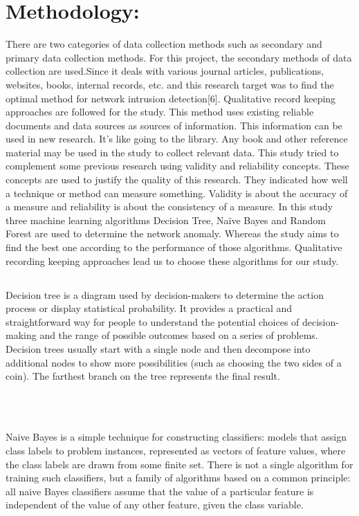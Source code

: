 \documentclass[conference]{IEEEtran}
\begin{document}
\section{Methodology:}

There are two categories of data collection methods such as secondary and primary data collection methods. For this project, the secondary methods of data collection are used.Since it deals with various journal articles, publications, websites, books, internal records, etc. and this research target was to find the optimal method for network intrusion detection[6]. Qualitative record keeping approaches are followed for the study. This method uses existing reliable documents and data sources as sources of information. This information can be used in new research. It's like going to the library. Any book and other reference material may be used in the study to collect relevant data. This study tried to complement some previous research using validity and reliability concepts. These concepts are used to justify the quality of this research. They indicated how well a technique or method can measure something. Validity is about the accuracy of a measure and reliability is about the consistency of a measure. In this study three machine learning algorithms Decision Tree, Naïve Bayes and Random Forest are used to determine the network anomaly. Whereas the study aims to find the best one according to the performance of those algorithms. Qualitative recording keeping approaches lead us to choose these algorithms for our study. 
\subsection{}
 Decision tree is a diagram used by decision-makers to determine the action process or display statistical probability. It provides a practical and straightforward way for people to understand the potential choices of decision-making and the range of possible outcomes based on a series of problems. Decision trees usually start with a single node and then decompose into additional nodes to show more possibilities (such as choosing the two sides of a coin). The farthest branch on the tree represents the final result.\\ \\

\\
\subsection{}
 Naive Bayes is a simple technique for constructing classifiers: models that assign class labels to problem instances, represented as vectors of feature values, where the class labels are drawn from some finite set. There is not a single algorithm for training such classifiers, but a family of algorithms based on a common principle: all naive Bayes classifiers assume that the value of a particular feature is independent of the value of any other feature, given the class variable. 
 \\
\end{document}
